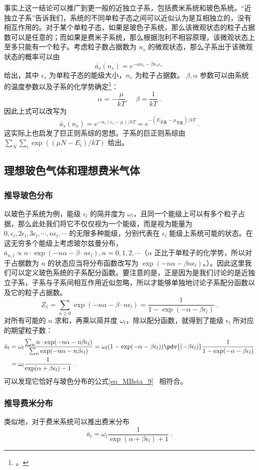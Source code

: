 事实上这一结论可以推广到更一般的近独立子系，包括费米系统和玻色系统。“近独立子系”告诉我们，系统的不同单粒子态之间可以近似认为是互相独立的，没有相互作用的。对于某个单粒子态，如果是玻色子系统，那么该微观状态的粒子占据数可以是任意的；而如果是费米子系统，那么根据泡利不相容原理，该微观状态上至多只能有一个粒子。考虑粒子数占据数为 $n_s$ 的微观状态，那么子系出于该微观状态的概率可以由 
\begin{equation}
\bar a_s(n_s) =  e^{-\alpha n_s-\beta n_s \epsilon_s}~
\end{equation}
给出，其中 $\epsilon_s$ 为单粒子态的能级大小，$n_s$ 为粒子占据数。
$\beta,\alpha$ 参数可以由系统的温度参数以及子系的化学势确定\footnote{。}：
\begin{equation}
\alpha=-\frac{\mu}{kT},\quad \beta=\frac{1}{kT}~.
\end{equation}
因此上式可以改写为
\begin{equation}
\bar a_s(n_s)= e^{-n_s(\epsilon_s-\mu)/kT}= e^{-(E_\text{子系}-\mu_\text{子系})/kT}~.
\end{equation}
这实际上也启发了巨正则系综的思想。子系的巨正则系综由 $\sum_N \sum_i \exp((\mu N-E_i)/kT)$ 给出。

\subsection{理想玻色气体和理想费米气体}
\subsubsection{推导玻色分布}
以玻色子系统为例，能级 $\epsilon_l$ 的简并度为 $\omega_l$，且同一个能级上可以有多个粒子占据，那么此处我们将它不仅仅视为一个能级，而是视为能量为 $0,\epsilon_l,2\epsilon_l,3\epsilon_l,\cdots, n\epsilon_l,\cdots$ 的无限多种能级，分别代表在 $\epsilon_l$ 能级上系统可能的状态。在这无穷多个能级上考虑玻尔兹曼分布，$\bar{a}_{n,l} \propto n\cdot \exp(-n\alpha-\beta\cdot n\epsilon_l),n=0,1,2,\cdots $（$\alpha$ 正比于单粒子的化学势，所以对于占据数为 $n$ 的状态应当将分布函数改写为 $\exp(-n\alpha-\beta n\epsilon_l)$。）。因此这里我们可以定义玻色系统的子系配分函数。要注意的是，正是因为是我们讨论的是近独立子系，子系与子系间相互作用近似忽略，所以才能够单独地讨论子系配分函数以及它的粒子占据数。
\begin{equation}
Z_1=\sum_{n\ge 0} \exp(-n\alpha-\beta\cdot n\epsilon_l)=\frac{1}{1-\exp(-\alpha-\beta\epsilon_l)}~.
\end{equation}
对所有可能的 $n$ 求和，再乘以简并度 $\omega_l$，除以配分函数，就得到了能级 $\epsilon_l$ 所对应的期望粒子数：
\begin{equation}\label{eq_depsys_1}
\begin{aligned}
\bar a_l&=\omega_l \frac{\sum_n n\cdot \exp(-n\alpha-n\beta\epsilon_l)}{\sum_n \exp(-n\alpha-n\beta\epsilon_l)}=\omega_l (1-\exp(-\alpha-\beta\epsilon_l)) \pdv{(-\beta\epsilon_l)} \frac{1}{1-\exp(-\alpha-\beta\epsilon_l)}\\
&=\omega_l \frac{1}{\exp(\alpha+\beta\epsilon_l)-1}~.
\end{aligned}
\end{equation}
可以发现它恰好与玻色分布的公式\autoref{eq_MBsta_9}~ 相符合。
\subsubsection{推导费米分布}
类似地，对于费米系统可以推出费米分布
\begin{equation}
\bar a_l=\omega_l \frac{1}{\exp(\alpha+\beta\epsilon_l)+1}~.
\end{equation}
